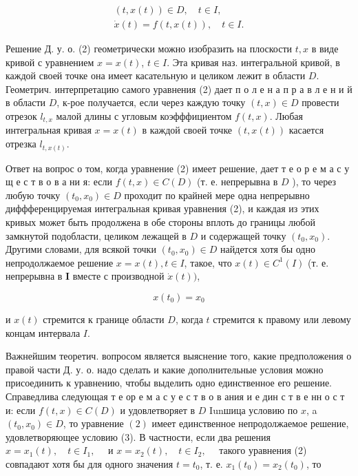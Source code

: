 \documentclass[10pt]{article}
\begin{document}
\[

\begin{gathered}

(t, x(t)) \in D, \quad t \in I, \\

\dot{x}(t)=f(t, x(t)), \quad t \in I .

\end{gathered}

\]



Решение Д. у. о. (2) геометрически можно изобразить на плоскости $t, x$ в виде кривой с уравнением $x=x(t)$, $t \in I$. Эта кривая наз. интегральной кривой, в каждой своей точке она имеет касательную и целиком лежит в области $D$. Геометрич. интерпретацию самого уравнения (2) дает п о л е н а п р а в л е н и й в области $D$, к-рое получается, если через каждую точку $(t, x) \in D$ провести отрезок $l_{t, x}$ малой длины с угловым коэфффициентом $f(t, x)$. Любая интегральная кривая $x=x(t)$ в каждой своей точке $(t, x(t))$ касается отрезка $l_{t, x(t)}$.



Ответ на вопрос о том, когда уравнение (2) имеет решение, дает т е о р е м а с у щ е с т в о в а ни я: если $f(t, x) \in C(D)$ (т. е. непрерывна в $D$ ), то через любую точку $\left(t_{0}, x_{0}\right) \in D$ проходит по крайней мере одна непрерывно диффференцируемая интегральная кривая уравнения (2), и каждая из этих кривых может быть продолжена в обе стороны вплоть до границы любой замкнутой подобласти, целиком лежащей в $D$ и содержащей точку $\left(t_{0}, x_{0}\right)$. Другими словами, для всякой точки $\left(t_{0}, x_{0}\right) \in D$ найдется хотя бы одно непродолжаемое решение $x=x(t), t \in I$, такое, что $x(t) \in C^{1}(I)$ (т. е. непрерывна в $\boldsymbol{I}$ вместе с производной $\dot{x}(t))$,



\[

x\left(t_{0}\right)=x_{0}

\]



и $x(t)$ стремится к границе области $D$, когда $t$ стремится к правому или левому концам интервала $I$.



Важнейшим теоретич. вопросом является выяснение того, какие предположения о правой части Д. у. о. надо сделать и какие дополнительные условия можно присоединить к уравнению, чтобы выделить одно единственное его решение. Справедлива следующая т е ор е м а с у е с т в о в ания и е дин с т в е нн о с т и: если $f(t, x) \in C(D)$ и удовлетворяет в $D$ Iunшица условию по $x$, a $\left(t_{0}, x_{0}\right) \in D$, то уравнение $(2)$ имеет единственное непродолжаемое решение, удовлетворяющее условию (3). В частности, если два решения $x=x_{1}(t), \quad t \in I_{1}, \quad$ и $x=x_{2}(t), \quad t \in I_{2}, \quad$ такого уравнения (2) совпадают хотя бы для одного значения $t=t_{0}$, т. е. $x_{1}\left(t_{0}\right)=x_{2}\left(t_{0}\right)$, то
\end{document}

